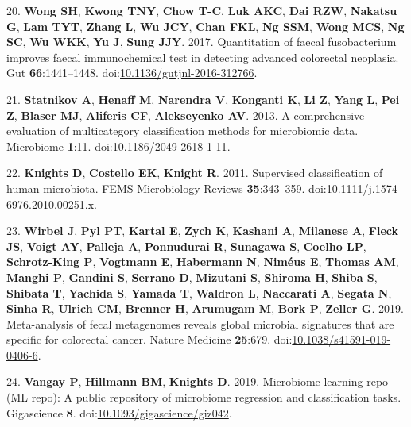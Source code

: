 \documentclass[11pt,]{article}
\begin{document}
\hypertarget{ref-wong_quantitation_2017}{}
20. \textbf{Wong SH}, \textbf{Kwong TNY}, \textbf{Chow T-C}, \textbf{Luk
AKC}, \textbf{Dai RZW}, \textbf{Nakatsu G}, \textbf{Lam TYT},
\textbf{Zhang L}, \textbf{Wu JCY}, \textbf{Chan FKL}, \textbf{Ng SSM},
\textbf{Wong MCS}, \textbf{Ng SC}, \textbf{Wu WKK}, \textbf{Yu J},
\textbf{Sung JJY}. 2017. Quantitation of faecal fusobacterium improves
faecal immunochemical test in detecting advanced colorectal neoplasia.
Gut \textbf{66}:1441--1448.
doi:\href{https://doi.org/10.1136/gutjnl-2016-312766}{10.1136/gutjnl-2016-312766}.

\hypertarget{ref-statnikov_comprehensive_2013}{}
21. \textbf{Statnikov A}, \textbf{Henaff M}, \textbf{Narendra V},
\textbf{Konganti K}, \textbf{Li Z}, \textbf{Yang L}, \textbf{Pei Z},
\textbf{Blaser MJ}, \textbf{Aliferis CF}, \textbf{Alekseyenko AV}. 2013.
A comprehensive evaluation of multicategory classification methods for
microbiomic data. Microbiome \textbf{1}:11.
doi:\href{https://doi.org/10.1186/2049-2618-1-11}{10.1186/2049-2618-1-11}.

\hypertarget{ref-knights_supervised_2011}{}
22. \textbf{Knights D}, \textbf{Costello EK}, \textbf{Knight R}. 2011.
Supervised classification of human microbiota. FEMS Microbiology Reviews
\textbf{35}:343--359.
doi:\href{https://doi.org/10.1111/j.1574-6976.2010.00251.x}{10.1111/j.1574-6976.2010.00251.x}.

\hypertarget{ref-wirbel_meta-analysis_2019}{}
23. \textbf{Wirbel J}, \textbf{Pyl PT}, \textbf{Kartal E}, \textbf{Zych
K}, \textbf{Kashani A}, \textbf{Milanese A}, \textbf{Fleck JS},
\textbf{Voigt AY}, \textbf{Palleja A}, \textbf{Ponnudurai R},
\textbf{Sunagawa S}, \textbf{Coelho LP}, \textbf{Schrotz-King P},
\textbf{Vogtmann E}, \textbf{Habermann N}, \textbf{Niméus E},
\textbf{Thomas AM}, \textbf{Manghi P}, \textbf{Gandini S},
\textbf{Serrano D}, \textbf{Mizutani S}, \textbf{Shiroma H},
\textbf{Shiba S}, \textbf{Shibata T}, \textbf{Yachida S}, \textbf{Yamada
T}, \textbf{Waldron L}, \textbf{Naccarati A}, \textbf{Segata N},
\textbf{Sinha R}, \textbf{Ulrich CM}, \textbf{Brenner H},
\textbf{Arumugam M}, \textbf{Bork P}, \textbf{Zeller G}. 2019.
Meta-analysis of fecal metagenomes reveals global microbial signatures
that are specific for colorectal cancer. Nature Medicine
\textbf{25}:679.
doi:\href{https://doi.org/10.1038/s41591-019-0406-6}{10.1038/s41591-019-0406-6}.

\hypertarget{ref-vangay_microbiome_2019}{}
24. \textbf{Vangay P}, \textbf{Hillmann BM}, \textbf{Knights D}. 2019.
Microbiome learning repo (ML repo): A public repository of microbiome
regression and classification tasks. Gigascience \textbf{8}.
doi:\href{https://doi.org/10.1093/gigascience/giz042}{10.1093/gigascience/giz042}.
\end{document}

